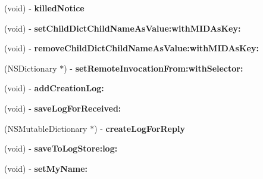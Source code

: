 \begin{DoxyCompactItemize}
\item 
\hypertarget{interface_messenger_system_a127cce35cc1c079fed1bceecccf23a66}{
(void) -\/ {\bfseries killedNotice}}
\label{dc/dc9/interface_messenger_system_a127cce35cc1c079fed1bceecccf23a66}

\item 
\hypertarget{interface_messenger_system_a57dd4208efc5d477c50c5c5f55fe7ff1}{
(void) -\/ {\bfseries setChildDictChildNameAsValue:withMIDAsKey:}}
\label{dc/dc9/interface_messenger_system_a57dd4208efc5d477c50c5c5f55fe7ff1}

\item 
\hypertarget{interface_messenger_system_aadeb829f6e394bbc36d77593ed6fe677}{
(void) -\/ {\bfseries removeChildDictChildNameAsValue:withMIDAsKey:}}
\label{dc/dc9/interface_messenger_system_aadeb829f6e394bbc36d77593ed6fe677}

\item 
\hypertarget{interface_messenger_system_a60c9a5dc9cf6d420d944edead0c957d8}{
(NSDictionary $\ast$) -\/ {\bfseries setRemoteInvocationFrom:withSelector:}}
\label{dc/dc9/interface_messenger_system_a60c9a5dc9cf6d420d944edead0c957d8}

\item 
\hypertarget{interface_messenger_system_aa4f4f9dbed2ccb22b30fa3bc86229560}{
(void) -\/ {\bfseries addCreationLog:}}
\label{dc/dc9/interface_messenger_system_aa4f4f9dbed2ccb22b30fa3bc86229560}

\item 
\hypertarget{interface_messenger_system_aea64a6b2e2486edb5a3443a23d13934f}{
(void) -\/ {\bfseries saveLogForReceived:}}
\label{dc/dc9/interface_messenger_system_aea64a6b2e2486edb5a3443a23d13934f}

\item 
\hypertarget{interface_messenger_system_a51d6be48e11ee01ba98c720b46ae398e}{
(NSMutableDictionary $\ast$) -\/ {\bfseries createLogForReply}}
\label{dc/dc9/interface_messenger_system_a51d6be48e11ee01ba98c720b46ae398e}

\item 
\hypertarget{interface_messenger_system_a04b3995de0fb3486ee1f64bc8868b8f3}{
(void) -\/ {\bfseries saveToLogStore:log:}}
\label{dc/dc9/interface_messenger_system_a04b3995de0fb3486ee1f64bc8868b8f3}

\item 
\hypertarget{interface_messenger_system_a0388f0bc3b5d73f8404fb65ae9f2478d}{
(void) -\/ {\bfseries setMyName:}}
\label{dc/dc9/interface_messenger_system_a0388f0bc3b5d73f8404fb65ae9f2478d}


\end{DoxyCompactItemize}
